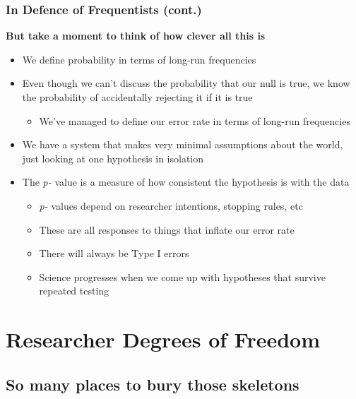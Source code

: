 \documentclass[10pt, block=fill]{beamer}
\begin{document}
\begin{frame}
    \frametitle{In Defence of Frequentists (cont.)}
    
    \textbf{But take a moment to think of how clever all this is}
    
    \begin{itemize}
        \item We define probability in terms of long-run frequencies
        \item Even though we can't discuss the probability that our null is true, we know the probability of accidentally rejecting it if it is true
        \begin{itemize}
            \item We've managed to define our error rate in terms of long-run frequencies
        \end{itemize}
        \item We have a system that makes very minimal assumptions about the world, just looking at one hypothesis in isolation
        \item The \textit{p-} value is a measure of how consistent the hypothesis is with the data
        \begin{itemize}
            \item \textit{p-} values depend on researcher intentions, stopping rules, etc
            \item These are all responses to things that inflate our error rate
            \item There will always be Type I errors
            \item Science progresses when we come up with hypotheses that survive repeated testing
        \end{itemize}
    \end{itemize}
    
\end{frame}


\section{Researcher Degrees of Freedom}
\subsection{So many places to bury those skeletons}
\end{document}

